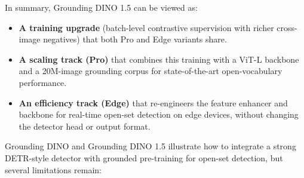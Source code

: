 \begin{enrichment}
\begin{enrichment}
		\noindent
		In summary, Grounding DINO 1.5 can be viewed as:
		\begin{itemize}
			\item \textbf{A training upgrade} (batch-level contrastive supervision with richer cross-image negatives) that both Pro and Edge variants share.
			\item \textbf{A scaling track (Pro)} that combines this training with a ViT-L backbone and a 20M-image grounding corpus for state-of-the-art open-vocabulary performance.
			\item \textbf{An efficiency track (Edge)} that re-engineers the feature enhancer and backbone for real-time open-set detection on edge devices, without changing the detector head or output format.
		\end{itemize}
	\end{enrichment}
	
	\begin{enrichment}
		\label{enr:chapter14_groundingdino_limitations}
	
	Grounding DINO and Grounding DINO 1.5 illustrate how to integrate a strong DETR-style detector with grounded pre-training for open-set detection, but several limitations remain:
	

\end{enrichment}
\end{enrichment}
